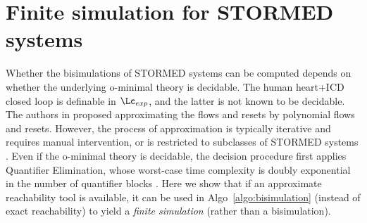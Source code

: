 \section{Finite simulation for STORMED systems}
\label{sec:simulationAprox}
Whether the bisimulations of STORMED systems can be computed depends on whether the underlying o-minimal theory is decidable. 
The human heart+ICD closed loop is definable in $\Lc_{exp}$, and the latter is not known to be decidable.
The authors in \cite{PrabhakarVVD09_toklerant} proposed approximating the flows and resets by polynomial flows and resets.
However, the process of approximation is typically iterative and requires manual intervention, or is restricted to subclasses of STORMED systems \cite{PrabhakarVVD09_toklerant}.
Even if the o-minimal theory is decidable, the decision procedure first applies Quantifier Elimination, whose worst-case time complexity is doubly exponential in the number of quantifier blocks \cite{DavenportH88_QE}.
%
Here we show that if an approximate reachability tool is available, it can be used in Algo~\ref{algo:bisimulation} (instead of exact reachability) to yield a \emph{finite simulation} (rather than a bisimulation).
